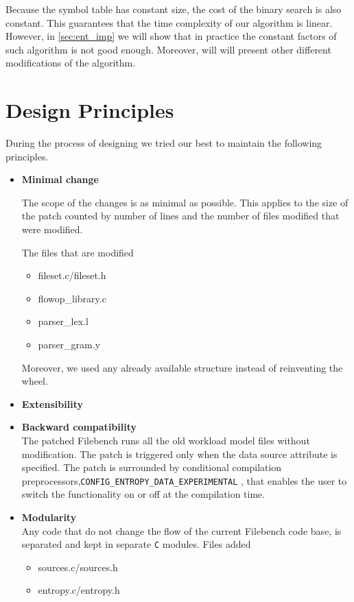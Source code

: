 Because the symbol table has constant size, the cost of the binary search is also constant.
This guarantees that the time complexity of our algorithm is linear. However, in \ref{sec:ent_imp} we will show that in practice the 
constant factors of such algorithm is not good enough. Moreover, will will present other different modifications
of the algorithm.


\section{Design Principles}
During the process of designing we tried our best to maintain the following principles. 

\begin{itemize}

\item \textbf{Minimal change} %

The scope of the changes is as minimal as possible. This applies to the size of the patch counted by number of lines and the number of files modified that were modified. 

The files that are modified
\begin{itemize}
\item fileset.c/fileset.h
\item flowop\_library.c
\item parser\_lex.l
\item parser\_gram.y
\end{itemize}
Moreover, we used any already available structure instead of reinventing the wheel.

\item \textbf{Extensibility} \\

\item \textbf{Backward compatibility} \\
The patched Filebench runs all the old workload model files without modification. The patch is triggered only when the data source attribute is specified.
 The patch is surrounded by conditional compilation preprocessors,\verb+CONFIG_ENTROPY_DATA_EXPERIMENTAL+ , that enables the user to switch the functionality on or off at the compilation time.

\item \textbf{Modularity}\\
Any code that do not change the flow of the current Filebench code base, is separated and kept in separate \verb+C+ modules.
 Files added
\begin{itemize}
\item sources.c/sources.h 
\item entropy.c/entropy.h
\end{itemize}

\end{itemize}
